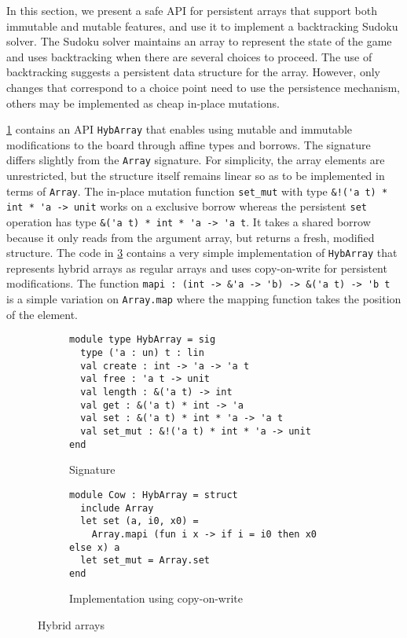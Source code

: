 In this section, we present
a safe API for persistent arrays that support both immutable and mutable features,
and use it to implement a backtracking Sudoku solver.
The Sudoku solver maintains an array to represent the state of
the game and uses backtracking when there are several choices to proceed.
The use of backtracking suggests a persistent data structure for the array.
However, only changes that correspond to a choice point need to use
the persistence mechanism, others may be implemented as
cheap in-place mutations.

\cref{sig:hybarray} contains an API \lstinline/HybArray/
that enables using mutable and immutable modifications to
the board through affine types and borrows.
The signature differs slightly from the \lstinline/Array/
signature. For simplicity, the array elements are unrestricted, but
the structure itself remains linear so as to be implemented in terms of \lstinline/Array/.
The in-place mutation function \lstinline/set_mut/ with type
\lstinline/&!('a t) * int * 'a -> unit/ works on a exclusive borrow  whereas the persistent
\lstinline/set/ operation has type \lstinline/&('a t) * int * 'a -> 'a t/. It
takes a shared borrow because it only reads from the
argument array, but returns a fresh,  modified structure.
The code in \cref{ex:cow} contains a very simple implementation of
\lstinline/HybArray/ that represents hybrid arrays
as regular arrays and uses copy-on-write for persistent
modifications. The function
\lstinline/mapi : (int -> &'a -> 'b) -> &('a t) -> 'b t /
is a simple variation on \lstinline/Array.map/ where the mapping function
takes the position of the element.


\begin{figure}[tp]
  \centering
  \begin{subfigure}{1\linewidth}
\begin{lstlisting}
module type HybArray = sig
  type ('a : un) t : lin
  val create : int -> 'a -> 'a t
  val free : 'a t -> unit
  val length : &('a t) -> int
  val get : &('a t) * int -> 'a
  val set : &('a t) * int * 'a -> 'a t
  val set_mut : &!('a t) * int * 'a -> unit
end
\end{lstlisting}
    \vspace{-15pt}
    \caption{Signature}
    \label{sig:hybarray}
  \end{subfigure}

  \begin{subfigure}{1\linewidth}
\begin{lstlisting}
module Cow : HybArray = struct
  include Array
  let set (a, i0, x0) =
    Array.mapi (fun i x -> if i = i0 then x0 else x) a
  let set_mut = Array.set
end
\end{lstlisting}
    \vspace{-15pt}
    \caption{Implementation using copy-on-write}
    \label{ex:cow}
  \end{subfigure}
  \caption{Hybrid arrays}
\end{figure}

